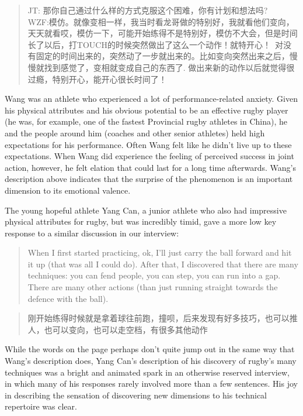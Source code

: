 \begin{CJK}{UTF8}{gbsn}
    \begin{quotation}
      JT: 那你自己通过什么样的方式克服这个困难，你有计划和想法吗? \\
      WZF:模仿。就像变相一样，我当时看龙哥做的特别好，我就看他们变向，天天就看哎，模仿一下，可能开始练得不是特别好，模仿不大会，但是时间长了以后，打TOUCH的时候突然做出了这么一个动作！就特开心！ 对没有固定的时间出来的，突然动了一步就出来的。比如变向突然出来之后，慢慢就找到感觉了，变相就变成自己的东西了. 做出来新的动作以后就觉得很过瘾，特别开心，能开心很长时间了！
    \end{quotation}

Wang was an athlete who experienced a lot of performance-related anxiety.  Given his physical attributes and his obvious potential to be an effective rugby player (he was, for example, one of the fastest Provincial rugby athletes in China), he and the people around him (coaches and other senior athletes) held high expectations for his performance. Often Wang felt like he didn't live up to these expectations.  When Wang did experience the feeling of perceived success in joint action, however, he felt elation that could last for a long time afterwards.  Wang's description above indicates that the surprise of the phenomenon is an important dimension to its emotional valence.

The young hopeful athlete Yang Can, a junior athlete who also had impressive physical attributes for rugby, but was incredibly timid, gave a more low key response to a similar discussion in our interview:

    \begin{quotation}
      When I first started practicing, ok, I’ll just carry the ball forward and hit it up (that was all I could do). After that, I discovered that there are many techniques: you can fend people, you can step, you can run into a gap. There are many other actions (than just running straight towards the defence with the ball).
    \end{quotation}

    \begin{quotation}
      刚开始练得时候就是拿着球往前跑，撞呗，后来发现有好多技巧，也可以推人，也可以变向，也可以走空档，有很多其他动作 
    \end{quotation}

While the words on the page perhaps don't quite jump out in the same way that Wang's description does, Yang Can's description of his discovery of rugby's many techniques was a bright and animated spark in an otherwise reserved interview, in which many of his responses rarely involved more than a few sentences.  His joy in describing the sensation of discovering new dimensions to his technical repertoire was clear.


\end{CJK}
